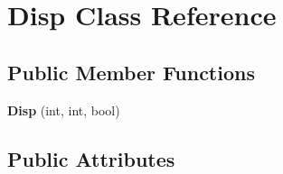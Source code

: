\hypertarget{classDisp}{\section{Disp Class Reference}
\label{classDisp}
}
\subsection*{Public Member Functions}
\begin{DoxyCompactItemize}
\item 
\hypertarget{classDisp_a460e997b0192107ba2b3cf1a5ec32e76}{{\bfseries Disp} (int, int, bool)}\label{classDisp_a460e997b0192107ba2b3cf1a5ec32e76}

\end{DoxyCompactItemize}
\subsection*{Public Attributes}
